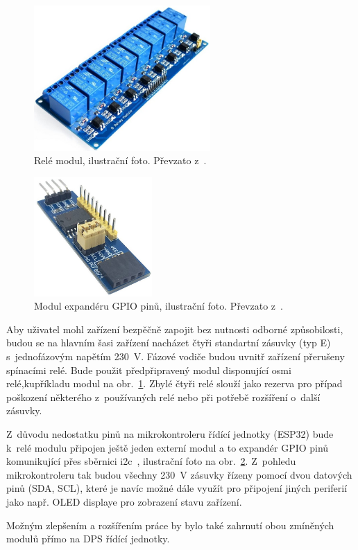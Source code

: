 \begin{figure}[h!]
    \centering
    \includegraphics[width=0.6\textwidth]{obrazky/230/rele.jpg}
    \caption{Relé modul, ilustrační foto. Převzato z~\cite{eshop-laskakit-rele}.}
    \label{fig:obrazky-230-rele-jpg}
\end{figure}

\begin{figure}[h!]
    \centering
    \includegraphics[width=0.4\textwidth]{obrazky/230/expander.jpg}
    \caption{Modul expandéru GPIO pinů, ilustrační foto. Převzato z~\cite{eshop-laskakit-expander}.}
    \label{fig:obrazky-230-expander-jpg}
\end{figure}

Aby uživatel mohl zařízení bezpěčně zapojit bez nutnosti odborné způsobilosti, budou se na hlavním šasi zařízení nacházet čtyři standartní zásuvky (typ E) s~jednofázovým napětím \qty{230}{V}. Fázové vodiče budou uvnitř zařízení přerušeny spínacími relé. Bude použit předpřipravený modul disponující osmi relé,kupříkladu modul na obr.~\ref{fig:obrazky-230-rele-jpg}. Zbylé čtyři relé slouží jako rezerva pro případ poškození některého z~používaných relé nebo při potřebě rozšíření o~další zásuvky. 

Z~důvodu nedostatku pinů na mikrokontroleru řídící jednotky (ESP32) bude k~relé modulu připojen ještě jeden externí modul a to expandér GPIO pinů komunikující přes sběrnici \acs{i2c}~\cite{eshop-laskakit-expander}, ilustrační foto na obr.~\ref{fig:obrazky-230-expander-jpg}. Z~pohledu mikrokontroleru tak budou všechny \qty{230}{V} zásuvky řízeny pomocí dvou datových pinů (SDA, SCL), které je navíc možné dále využít pro připojení jiných periferií jako např. OLED displaye pro zobrazení stavu zařízení. 

Možným zlepšením a rozšířením práce by bylo také zahrnutí obou zmíněných modulů přímo na DPS řídící jednotky. 


